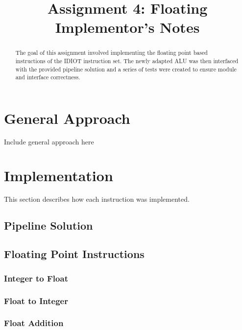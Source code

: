 \documentclass[conference]{IEEEtran}
\begin{document}
\title{Assignment 4: Floating\\Implementor's Notes}
\author{
        }

\maketitle

\begin{abstract}
The goal of this assignment involved implementing the floating point based
instructions of the IDIOT instruction set. The newly adapted ALU was then
interfaced with the provided pipeline solution and a series of tests were created
to ensure module and interface correctness.
\end{abstract}

\section{General Approach}
Include general approach here

\section{Implementation}
This section describes how each instruction was implemented.

\subsection{Pipeline Solution}

\subsection{Floating Point Instructions}
\subsubsection{Integer to Float}

\subsubsection{Float to Integer}

\subsubsection{Float Addition}
\end{document}
